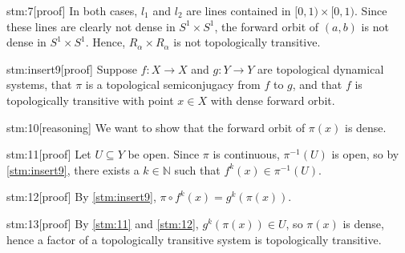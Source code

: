 \begin{stm}{stm:7}[proof]
In both cases, $l_1$ and $l_2$ are lines contained in $[0,1) \times [0,1)$. Since these lines are clearly not dense in $S^1 \times S^1$, the forward orbit of $(a,b)$ is not dense in $S^1 \times S^1$. Hence, $R_\alpha \times R_\alpha$ is not topologically transitive.
\end{stm}

\begin{stm}{stm:insert9}[proof]
Suppose $f: X \to X$ and $g: Y \to Y$ are topological dynamical systems, that $\pi$ is a topological semiconjugacy from $f$ to $g$, and that $f$ is topologically transitive with point $x \in X$ with dense forward orbit.
\end{stm}

\begin{stm}{stm:10}[reasoning]
We want to show that the forward orbit of $\pi(x)$ is dense.
\end{stm}

\begin{stm}{stm:11}[proof]
Let $U \subseteq Y$ be open. Since $\pi$ is continuous, $\pi^{-1}(U)$ is open, so by \ref{stm:insert9}, there exists a $k \in \mathbb{N}$ such that $f^k(x) \in \pi^{-1}(U)$.
\end{stm}

\begin{stm}{stm:12}[proof]
By \ref{stm:insert9}, $\pi \circ f^k(x) = g^k(\pi(x))$.
\end{stm}

\begin{stm}{stm:13}[proof]
By \ref{stm:11} and \ref{stm:12}, $g^k(\pi(x)) \in U$, so $\pi(x)$ is dense, hence a factor of a topologically transitive system is topologically transitive.
\end{stm}
